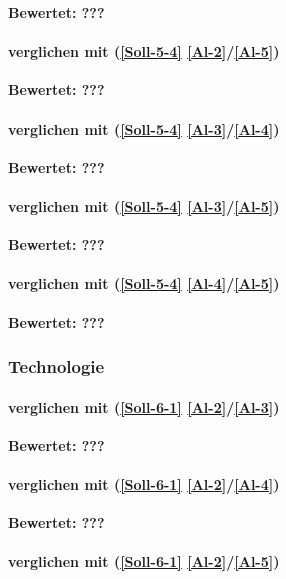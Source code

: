 \textbf{Bewertet: ???}

\paragraph*{  verglichen mit  (\ref{Soll-5-4} \ref{Al-2}/\ref{Al-5})}

\textbf{Bewertet: ???}

\paragraph*{  verglichen mit  (\ref{Soll-5-4} \ref{Al-3}/\ref{Al-4})}

\textbf{Bewertet: ???}

\paragraph*{  verglichen mit  (\ref{Soll-5-4} \ref{Al-3}/\ref{Al-5})}

\textbf{Bewertet: ???}


\paragraph*{  verglichen mit  (\ref{Soll-5-4} \ref{Al-4}/\ref{Al-5})}

\textbf{Bewertet: ???}

\subsubsection{Technologie}

\paragraph*{  verglichen mit  (\ref{Soll-6-1} \ref{Al-2}/\ref{Al-3})}

\textbf{Bewertet: ???}

\paragraph*{  verglichen mit  (\ref{Soll-6-1} \ref{Al-2}/\ref{Al-4})}

\textbf{Bewertet: ???}

\paragraph*{  verglichen mit  (\ref{Soll-6-1} \ref{Al-2}/\ref{Al-5})}

